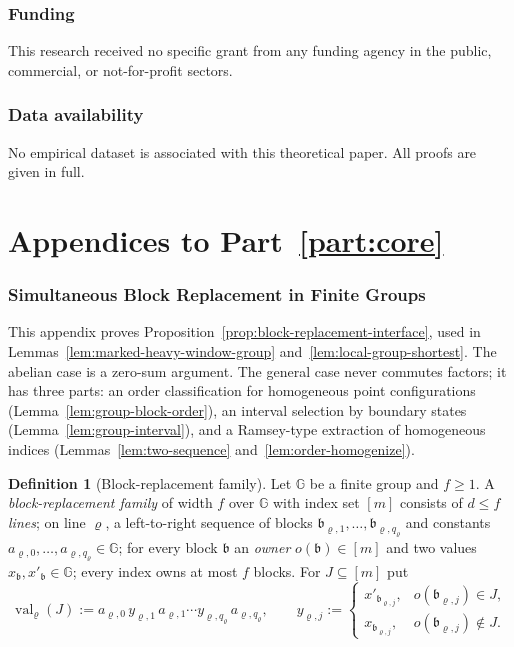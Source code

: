 \documentclass[11pt]{article}
\numberwithin{equation}{section}
\theoremstyle{plain}
\theoremstyle{definition}
\newtheorem{definition}[theorem]{Definition}
\theoremstyle{remark}
\theoremstyle{plain}
\begin{document}
\section*{Funding}
This research received no specific grant from any funding agency in the public,
commercial, or not-for-profit sectors.

\section*{Data availability}
No empirical dataset is associated with this theoretical paper.  All proofs
are given in full.

\appendix
\part*{Appendices to Part~\ref{part:core}}

\section{Simultaneous Block Replacement in Finite Groups}
\label{app:group-blocks}

This appendix proves Proposition~\ref{prop:block-replacement-interface}, used in
Lemmas~\ref{lem:marked-heavy-window-group} and~\ref{lem:local-group-shortest}.
The abelian case is a zero-sum argument.  The general case never commutes
factors; it has three parts: an order classification for homogeneous point
configurations (Lemma~\ref{lem:group-block-order}), an interval selection by
boundary states (Lemma~\ref{lem:group-interval}), and a Ramsey-type extraction of
homogeneous indices (Lemmas~\ref{lem:two-sequence} and~\ref{lem:order-homogenize}).

\begin{definition}[Block-replacement family]
\label{def:block-family}
Let ${\mathbb G}$ be a finite group and $f\ge1$.  A \emph{block-replacement family} of
width $f$ over ${\mathbb G}$ with index set $[m]$ consists of $d\le f$ \emph{lines}; on
line $\varrho$, a left-to-right sequence of blocks $\mathfrak b_{\varrho,1},\ldots,\mathfrak b_{\varrho,q_\varrho}$
and constants $a_{\varrho,0},\ldots,a_{\varrho,q_\varrho}\in {\mathbb G}$; for every block $\mathfrak b$ an
\emph{owner} $o(\mathfrak b)\in[m]$ and two values $x_{\mathfrak b},x'_{\mathfrak b}\in {\mathbb G}$; every
index owns at most $f$ blocks.  For $J\subseteq[m]$ put
\[
 \operatorname{val}_\varrho(J):=a_{\varrho,0}\,y_{\varrho,1}\,a_{\varrho,1}\cdots y_{\varrho,q_\varrho}\,a_{\varrho,q_\varrho},
 \qquad
 y_{\varrho,j}:=
 \begin{cases}
 x'_{\mathfrak b_{\varrho,j}},& o(\mathfrak b_{\varrho,j})\in J,\\
 x_{\mathfrak b_{\varrho,j}},& o(\mathfrak b_{\varrho,j})\notin J.
 \end{cases}
\]
\end{definition}
\end{document}

